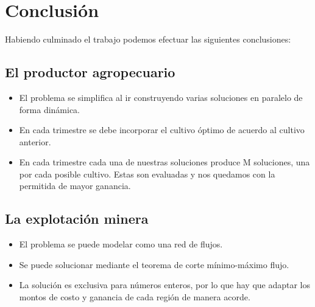 \section{Conclusión}
Habiendo culminado el trabajo podemos efectuar las siguientes conclusiones:
 \subsection{El productor agropecuario}    
\begin{itemize}
    \item El problema se simplifica al ir construyendo varias soluciones en paralelo de forma dinámica.
    \item En cada trimestre se debe incorporar el cultivo óptimo de acuerdo al cultivo anterior.
    \item En cada trimestre cada una de nuestras soluciones produce M soluciones, una por cada posible cultivo. Estas son evaluadas y nos quedamos con la permitida de mayor ganancia.
    
\end{itemize}
 \subsection{La explotación minera}    
\begin{itemize}
    \item El problema se puede modelar como una red de flujos.
    \item Se puede solucionar mediante el teorema de corte mínimo-máximo flujo.
    \item La solución es exclusiva para números enteros, por lo que hay que adaptar los montos de costo y ganancia de cada región de manera acorde.

\end{itemize}
